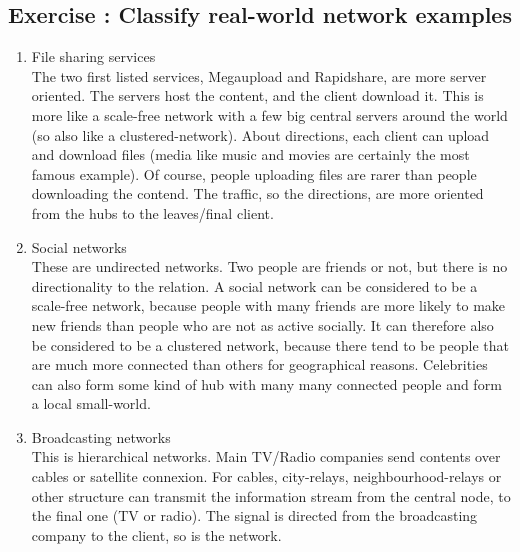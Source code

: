 \documentclass[10pt,a4paper]{article}
\newcommand{\exercise}[1]
{
  \stepcounter{subsection}
  \subsection*{Exercise \thesubsection: #1}

}
\begin{document}
\newpage
\exercise{Classify real-world network examples}
\begin{enumerate}
	\item File sharing services\\
	
	 The two first listed services, Megaupload and Rapidshare, are more server oriented. The servers host the content, and the client download it. This is more like a scale-free network with a few big central servers around the world (so also like a clustered-network). About directions, each client can upload and download files (media like music and movies are certainly the most famous example). Of course, people uploading files are rarer than people downloading the contend. The traffic, so the directions, are more oriented from the hubs to the leaves/final client. 
	
	
	\item Social networks\\
	
	These are undirected networks. Two people are friends or not, but there is no directionality to
	the relation.
	A social network can be considered to be a scale-free network, because people with many
	friends are more likely to make new friends than people who are not as active socially. It can
	therefore also be considered to be a clustered network, because there tend to be people that
	are much more connected than others for geographical reasons. Celebrities can also form some kind of hub with many many connected people and form a local small-world. 
	
	
	\item Broadcasting networks\\
	
	This is hierarchical networks. Main TV/Radio companies send contents over cables or satellite connexion. For cables, city-relays, neighbourhood-relays or other structure can transmit the information stream from the central node, to the final one (TV or radio). The signal is directed from the broadcasting company to the client, so is the network.   
	

\end{enumerate}
	
	
\end{document}
